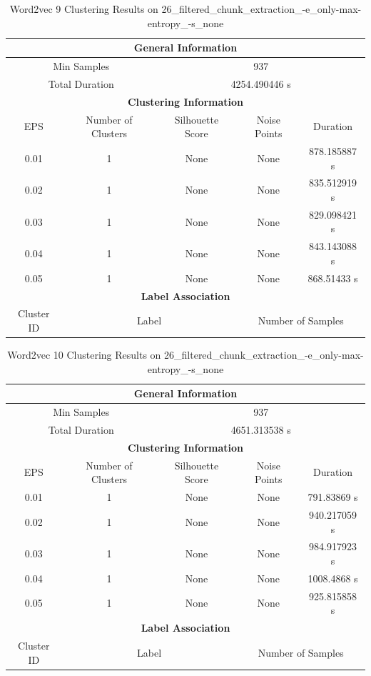 \begin{longtable}{|c|c|c|c|c|}
\caption{Word2vec 9 Clustering Results on 26\_filtered\_chunk\_extraction\_-e\_only-max-entropy\_-s\_none} \label{tab:26_filtered_chunk_extraction_-e_only-max-entropy_-s_none_word2vec_9_clustering_results}\\
\hline
\multicolumn{5}{|c|}{\textbf{General Information}} \\
\hline
\multicolumn{2}{|c|}{Min Samples} & \multicolumn{3}{c|}{937} \\
\multicolumn{2}{|c|}{Total Duration} & \multicolumn{3}{c|}{4254.490446 s} \\
\hline
\multicolumn{5}{|c|}{\textbf{Clustering Information}} \\
\hline
EPS & Number of Clusters & Silhouette Score & Noise Points & Duration \\
0.01 & 1 & None & None & 878.185887 s\\
0.02 & 1 & None & None & 835.512919 s\\
0.03 & 1 & None & None & 829.098421 s\\
0.04 & 1 & None & None & 843.143088 s\\
0.05 & 1 & None & None & 868.51433 s\\
\hline
\multicolumn{5}{|c|}{\textbf{Label Association}} \\
\hline
Cluster ID & \multicolumn{2}{c|}{Label} & \multicolumn{2}{c|}{Number of Samples} \\
\hline
\end{longtable}


\begin{longtable}{|c|c|c|c|c|}
\caption{Word2vec 10 Clustering Results on 26\_filtered\_chunk\_extraction\_-e\_only-max-entropy\_-s\_none} \label{tab:26_filtered_chunk_extraction_-e_only-max-entropy_-s_none_word2vec_10_clustering_results}\\
\hline
\multicolumn{5}{|c|}{\textbf{General Information}} \\
\hline
\multicolumn{2}{|c|}{Min Samples} & \multicolumn{3}{c|}{937} \\
\multicolumn{2}{|c|}{Total Duration} & \multicolumn{3}{c|}{4651.313538 s} \\
\hline
\multicolumn{5}{|c|}{\textbf{Clustering Information}} \\
\hline
EPS & Number of Clusters & Silhouette Score & Noise Points & Duration \\
0.01 & 1 & None & None & 791.83869 s\\
0.02 & 1 & None & None & 940.217059 s\\
0.03 & 1 & None & None & 984.917923 s\\
0.04 & 1 & None & None & 1008.4868 s\\
0.05 & 1 & None & None & 925.815858 s\\
\hline
\multicolumn{5}{|c|}{\textbf{Label Association}} \\
\hline
Cluster ID & \multicolumn{2}{c|}{Label} & \multicolumn{2}{c|}{Number of Samples} \\
\hline
\end{longtable}



